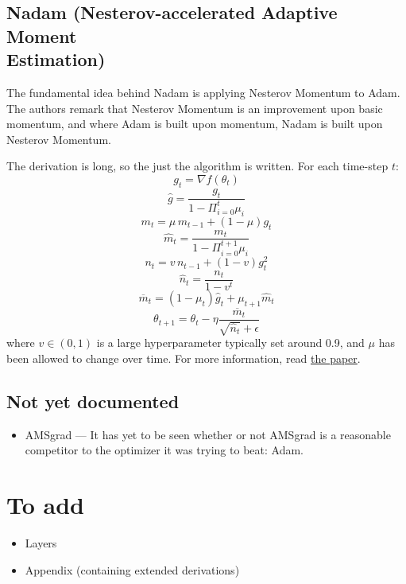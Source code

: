 \documentclass[fleqn]{article}
\begin{document}
\subsection{Nadam (Nesterov-accelerated Adaptive Moment\\Estimation)}
The fundamental idea behind Nadam is applying Nesterov Momentum to Adam.
The authors remark that Nesterov Momentum is an improvement upon basic
momentum, and where Adam is built upon momentum, Nadam is built upon
Nesterov Momentum.

The derivation is long, so the just the algorithm is written. For each
time-step $t$:
\[ g_t = \nabla f(\theta_t) \]
\[ \hat{g} = \frac{g_t}{1 - \Pi_{i=0}^t \mu_i } \]
\[ m_t = \mu \, m_{t-1} + (1 - \mu) g_t \]
\[ \hat{m}_t = \frac{m_t}{1 - \Pi_{i=0}^{t+1} \mu_i} \]
\[ n_t = v \, n_{t-1} + (1 - v)g_t^2 \]
\[ \hat{n}_t = \frac{n_t}{1 - v^t} \]
\[ \overline{m}_t = (1 - \mu_t)\hat{g}_t + \mu_{t+1} \hat{m}_t \]
\[ \theta_{t+1} = \theta_t -
\eta \frac{\overline{m}_t}{\sqrt{\hat{n}_t} + \epsilon} \]
where $v \in (0, 1)$ is a large hyperparameter typically set around 0.9,
and $\mu$ has been allowed to change over time. For more information, read
\href{http://cs229.stanford.edu/proj2015/054_report.pdf}{the paper}.

\subsection{Not yet documented}
\begin{itemize}
	\item AMSgrad --- It has yet to be seen whether or not AMSgrad is a
	reasonable competitor to the optimizer it was trying to beat: Adam.
\end{itemize}

\section{To add}
\begin{itemize}
	\item Layers
	\item Appendix (containing extended derivations)
\end{itemize}
\end{document}
